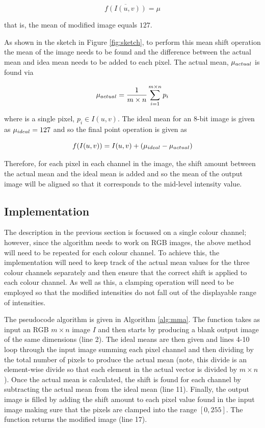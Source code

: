 \documentclass[journal,transmag]{IEEEtran}
\begin{document}
\begin{equation}
	\overline{f(I(u, v))} = \mu
\end{equation}

\noindent that is, the mean of modified image equals $127$.

As shown in the sketch in Figure \ref{fig:sketch}, to perform this mean shift operation the mean of the image needs to be found and the difference between the actual mean and idea mean needs to be added to each pixel.  The actual mean, $\mu_{\mbox{\tiny{actual}}}$ is found via

\begin{equation}
	\mu_{\mbox{\tiny{actual}}} = \frac{1}{m \times n}\sum_{i=1}^{m \times n} p_{i}
\end{equation}

\noindent where is a single pixel, $p_{i} \in I(u, v)$.  The ideal mean for an $8$-bit image is given as $\mu_{\mbox{\tiny{ideal}}} = 127$ and so the final point operation is given as

\begin{equation}
	f(I(u, v)) = I(u, v) + (\mu_{\mbox{\tiny{ideal}}} - \mu_{\mbox{\tiny{actual}}})
\end{equation}

Therefore, for each pixel in each channel in the image, the shift amount between the actual mean and the ideal mean is added and so the mean of the output image will be aligned so that it corresponds to the mid-level intensity value.

\subsection{Implementation}

The description in the previous section is focussed on a single colour channel; however, since the algorithm needs to work on RGB images, the above method will need to be repeated for each colour channel.  To achieve this, the implementation will need to keep track of the actual mean values for the three colour channels separately and then ensure that the correct shift is applied to each colour channel.  As well as this, a clamping operation will need to be employed so that the modified intensities do not fall out of the displayable range of intensities.

The pseudocode algorithm is given in Algorithm \ref{alg:mma}.  The function takes as input an RGB $m \times n$ image $I$ and then starts by producing a blank output image of the same dimensions (line 2).  The ideal means are then given and lines 4-10 loop through the input image summing each pixel channel and then dividing by the total number of pixels to produce the actual mean (note, this divide is an element-wise divide so that each element in the actual vector is divided by $m \times n$).   Once the actual mean is calculated, the shift is found for each channel by subtracting the actual mean from the ideal mean (line 11).  Finally, the output image is filled by adding the shift amount to each pixel value found in the input image making sure that the pixels are clamped into the range $[0,255]$.  The function returns the modified image (line 17).
\end{document}
